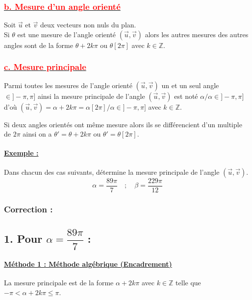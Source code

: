 \documentclass[12pt,a4paper]{article}
\begin{document}
\subsubsection*{\underline{\textbf{\textcolor{red}{b. Mesure d’un angle orienté }}}}
Soit $\vec{u}$ et $\vec{v}$ deux vecteurs non nuls du plan.\\
Si $\theta$ est une mesure de l'angle orienté $(\vec{u}, \vec{v})$ alors les autres mesures des autres angles sont de la forme $\theta + 2k\pi$ ou $\theta[2\pi]$ avec $k \in \mathbb{Z}$.
\subsubsection*{\underline{\textbf{\textcolor{red}{c. Mesure principale }}}}
Parmi toutes les mesures de l'angle orienté $(\vec{u}, \vec{v})$ un et un seul angle $\in ]-\pi, \pi]$ ainsi la mesure principale de l'angle $(\vec{u}, \vec{v})$ est noté $\alpha / \alpha \in ]-\pi, \pi]$ d'où $(\vec{u}, \vec{v}) = \alpha + 2k\pi = \alpha[2\pi] / \alpha \in ]-\pi, \pi]$ avec $k \in \mathbb{Z}$.

Si deux angles orientés ont même mesure alors ils se différencient d'un multiple de $2\pi$ ainsi on a $\theta' = \theta + 2k\pi$ ou $\theta' = \theta[2\pi]$.

\paragraph{\underline{\textcolor{myred}{\textbf{Exemple :}}}}
Dans chacun des cas suivants, détermine la mesure principale de l'angle $(\vec{u}, \vec{v})$.
\[
\alpha = \frac{89\pi}{7} \quad ; \quad \beta = \frac{229\pi}{12}
\]

\vspace{0.3cm}

\subsubsection*{\textcolor{myred}{Correction :}}

\subsection*{\textcolor{myblue}{1. Pour $\alpha = \dfrac{89\pi}{7}$ :}}

\paragraph{\underline{\textcolor{myred}{Méthode 1 : Méthode algébrique (Encadrement)}}}
La mesure principale est de la forme $\alpha + 2k\pi$ avec $k \in \mathbb{Z}$ telle que $-\pi < \alpha + 2k\pi \le \pi$.
\end{document}
